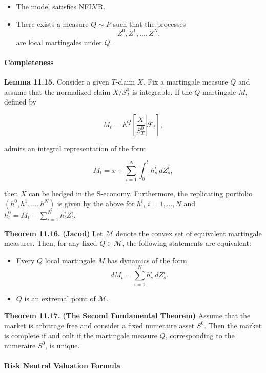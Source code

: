 \documentclass[
]{article}
\providecommand{\tightlist}{%
  \setlength{\itemsep}{0pt}\setlength{\parskip}{0pt}}
\begin{document}
\begin{itemize}
\tightlist
\item
  The model satisfies NFLVR.
\item
  There exists a measure \(Q\sim P\) such that the processes \[
    Z^0,Z^1,...,Z^N,
    \] are local martingales under \(Q\).
\end{itemize}

\hypertarget{completeness-1}{%
\paragraph{Completeness}\label{completeness-1}}

\textbf{Lemma 11.15.} Consider a given \(T\)-claim \(X\). Fix a
martingale measure \(Q\) and assume that the normalized claim
\(X/S^0_T\) is integrable. If the \(Q\)-martingale \(M\), defined by

\[
M_t=E^Q\left[\left. \frac{X}{S^0_T}\right\vert \mathcal{F}_t\right],
\]

admits an integral representation of the form

\[
M_t=x+\sum_{i=1}^N\int_0^th_s^i\ dZ_s^i,
\]

then \(X\) can be hedged in the S-economy. Furthermore, the replicating
portfolio \((h^0,h^1,...,h^N)\) is given by the above for \(h^i\),
\(i=1,...,N\) and \(h_t^0=M_t-\sum_{i=1}^Nh_t^iZ_t^i\).

\textbf{Theorem 11.16.} \textbf{(Jacod)} Let \(\mathcal{M}\) denote the
convex set of equivalent martingale measures. Then, for any fixed
\(Q\in\mathcal{M}\), the following statements are equivalent:

\begin{itemize}
\tightlist
\item
  Every \(Q\) local martingale \(M\) has dynamics of the form \[
    dM_t=\sum_{i=1}^Nh_s^i\ dZ_s^i.
    \]
\item
  \(Q\) is an extremal point of \(\mathcal{M}\).
\end{itemize}

\textbf{Theorem 11.17.} \textbf{(The Second Fundamental Theorem)} Assume
that the market is arbitrage free and consider a fixed numeraire asset
\(S^0\). Then the market is complete if and onlt if the martingale
measure \(Q\), corresponding to the numeraire \(S^0\), is unique.

\hypertarget{risk-neutral-valuation-formula}{%
\paragraph{Risk Neutral Valuation
Formula}\label{risk-neutral-valuation-formula}}
\end{document}
